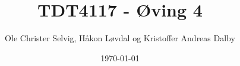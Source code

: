 \documentclass[a4paper, norsk, 10pt]{article}
\begin{document}
\title{TDT4117 - Øving 4}
\author{Ole Christer Selvig, Håkon Løvdal og Kristoffer Andreas Dalby}
\date{\today}
\maketitle
\thispagestyle{empty}

\pagebreak






\end{document}
